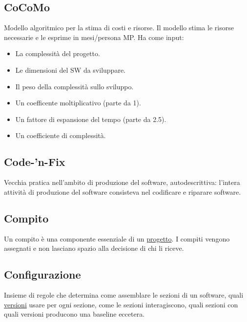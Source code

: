 	\subsection{CoCoMo}
	\label{sec:cocomo}
	Modello algoritmico per la stima di costi e risorse. Il modello stima le risorse necessarie e le esprime in mesi/persona MP. Ha come input:
	\begin{itemize}  
	\item La complessità del progetto.
	\item Le dimensioni del SW da sviluppare.
	\item Il peso della complessità sullo sviluppo.
	\item Un coefficente moltiplicativo (parte da 1).
	\item Un fattore di espansione del tempo (parte da 2.5).
	\item Un coefficiente di complessità. 
	\end{itemize}		

	\subsection{Code-'n-Fix}
	\label{sec:codenfix}
	Vecchia pratica nell'ambito di produzione del software, autodescrittiva: l'intera attività di produzione del software consisteva nel codificare e riparare software.
	
	\subsection{Compito}
	\label{sec:compiti}
	Un compito è una componente essenziale di un \hyperref[sec:progetto]{progetto}. I compiti vengono assegnati e non lasciano spazio alla decisione di chi li riceve.
	
	\subsection{Configurazione}
	\label{sec:configurazione}
	Insieme di regole che determina come assemblare le sezioni di un software, quali \hyperref[sec:versione]{versioni} usare per ogni sezione, come le sezioni interagiscono, quali sezioni con quali versioni producono una baseline eccetera.
	
